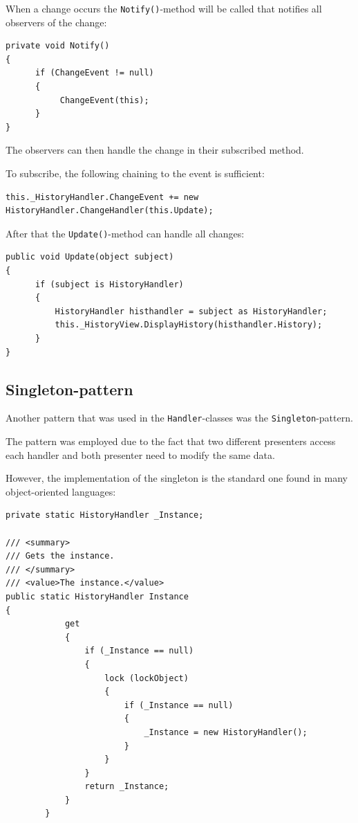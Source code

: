 When a change occurs the \texttt{Notify()}-method will be called that notifies all observers of the change:

\begin{lstlisting}[caption=Notifying observers.]
private void Notify()
{
      if (ChangeEvent != null)
      {
           ChangeEvent(this);
      }
}
\end{lstlisting}

The observers can then handle the change in their subscribed method.

To subscribe, the following chaining to the event is sufficient:

\begin{lstlisting}[caption=Registering as an observer.]
this._HistoryHandler.ChangeEvent += new HistoryHandler.ChangeHandler(this.Update);
\end{lstlisting}

After that the \texttt{Update()}-method can handle all changes:

\begin{lstlisting}[caption=Handling changes in the observer.]
public void Update(object subject)
{
      if (subject is HistoryHandler)
      {
          HistoryHandler histhandler = subject as HistoryHandler;
          this._HistoryView.DisplayHistory(histhandler.History);
      }
}
\end{lstlisting}

\subsection{Singleton-pattern}

Another pattern that was used in the \texttt{Handler}-classes was the \texttt{Singleton}-pattern.

The pattern was employed due to the fact that two different presenters access each handler and both presenter need to modify the same data.

However, the implementation of the singleton is the standard one found in many object-oriented languages:

\begin{lstlisting}[caption=Thread-safe lazy-initialization.]
private static HistoryHandler _Instance;

/// <summary>
/// Gets the instance.
/// </summary>
/// <value>The instance.</value>
public static HistoryHandler Instance
{
            get
            {
                if (_Instance == null)
                {
                    lock (lockObject)
                    {
                        if (_Instance == null)
                        {
                            _Instance = new HistoryHandler();
                        }
                    }
                }
                return _Instance;
            }
        }
\end{lstlisting}

